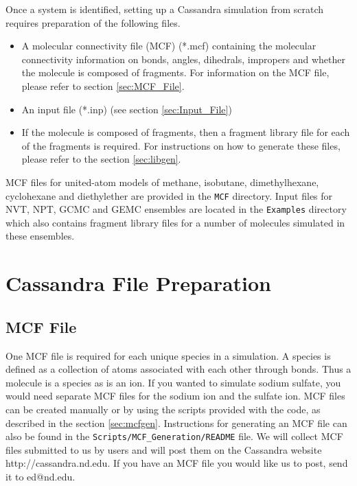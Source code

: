Once a system is identified, setting up a Cassandra simulation from
scratch requires preparation of the following files. \\

\begin{itemize}
\item A molecular connectivity file (MCF)  (*.mcf) containing the molecular
  connectivity information on bonds, angles, dihedrals, impropers and
  whether the molecule is composed of fragments. For information on
  the MCF file, please refer to section \ref{sec:MCF_File}.

\item An input file (*.inp) (see section \ref{sec:Input_File})

\item If the molecule is composed of fragments, then a fragment library file for each of the fragments is required. For instructions on how to generate these files, please refer to the
section \ref{sec:libgen}.

\end{itemize}
%
MCF files for united-atom models of methane, isobutane, dimethylhexane, cyclohexane and diethylether are provided in the \texttt{MCF} directory. Input files for NVT, NPT, GCMC and GEMC ensembles are located in the \texttt{Examples} directory which also contains fragment library files for a number of molecules simulated in these ensembles. 


\section{Cassandra File Preparation}

\subsection{MCF File}
One MCF file is required for each unique species in a simulation. A
species is defined as a collection of atoms associated with each other
through bonds. Thus a molecule is a species as is an ion. If you
wanted to simulate sodium sulfate, you would need separate MCF files
for the sodium ion and the sulfate ion. MCF files can be created manually 
or by using the scripts provided with the code, as described in
the section \ref{sec:mcfgen}. Instructions for generating an MCF file can also be found in the \texttt{Scripts/MCF\_Generation/README} file. 
We will collect MCF files submitted to us by users and will post them on the Cassandra
website http://cassandra.nd.edu. If you have an MCF file you would
like us to post, send it to ed@nd.edu.
%
%

